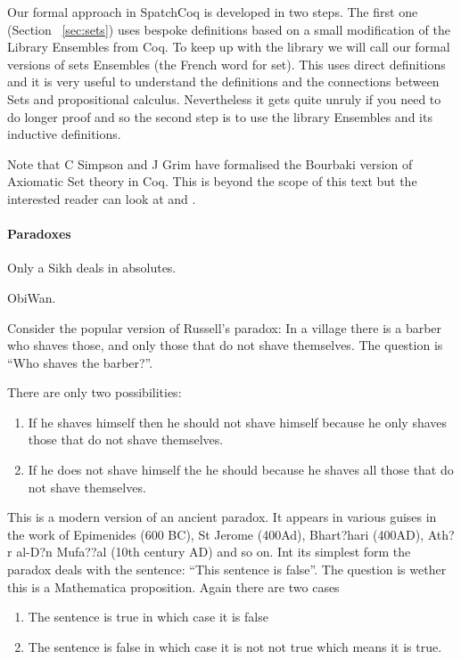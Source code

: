 Our formal approach in SpatchCoq is developed in two steps. The first one (Section~ \ref{sec:sets}) uses bespoke definitions based on a small modification of the Library Ensembles from Coq. To keep up with the library we will call our formal versions of sets Ensembles (the French word for set). This uses direct definitions and it is very useful to understand the definitions and the connections between Sets and propositional calculus. Nevertheless it gets quite unruly if you need to do longer proof and so the second step is to use the library Ensembles and its inductive definitions.

Note that C Simpson and J Grim have formalised the Bourbaki version of Axiomatic Set theory in Coq. This is beyond the scope of this text but the interested reader can look at  \cite{simp04} and \cite{grimm}.
 \paragraph{\bf Paradoxes}\label{sec:paradoxes} 
 \epigraph{Only a Sikh deals in absolutes. }{ ObiWan.}
 
 Consider the popular version of Russell's paradox: In a village there is a barber who shaves those, and only those that do not shave themselves. The question is ``Who shaves the barber?''. 
 
 There are only two possibilities:
 \begin{enumerate}
 \item If he shaves himself then he should not shave himself because he only shaves those that do not shave themselves.
 \item If he does not shave himself the he should because he shaves all those that do not shave themselves.
 \end{enumerate}
 
 This is a modern version of an ancient paradox. It appears in various guises in the work of  Epimenides (600 BC), St Jerome (400Ad), Bhart?hari (400AD), Ath?r al-D?n Mufa??al (10th century AD) and so on. Int its simplest form the  paradox deals with the sentence: ``This sentence is false''. The question is wether this is a Mathematica proposition.
 Again there are two cases
 \begin{enumerate}
 \item The sentence is true in which case it is false
 \item The sentence is false in which case it is not not true which means it is true.
 \end{enumerate}
 
